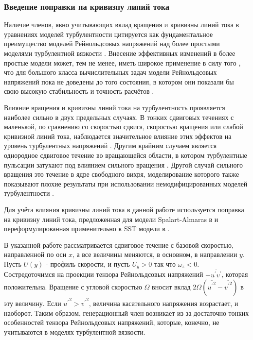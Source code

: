 \documentclass[pdftex,a4paper,12pt]{article}
\begin{document}
	\subsubsection{Введение поправки на кривизну линий тока}
		\label{CC}
		Наличие членов, явно учитывающих вклад вращения и кривизны линий тока в уравнениях моделей турбулентности цитируется как фундаментальное преимущество моделей Рейнольдсовых напряжений над более простыми моделями турбулентной вязкости \cite{ShurSpallart}. Внесение эффективных изменений в более простые модели может, тем не менее, иметь широкое применение в силу того \cite{CC2}, что для большого класса вычислительных задач модели Рейнольдсовых напряжений пока не доведены до того состояния, в котором они показали бы свою высокую стабильность и точность расчётов \cite{CC3}.
		
		Влияние вращения и кривизны линий тока на турбулентность проявляется наиболее сильно в двух предельных случаях. В тонких сдвиговых течениях с маленькой, по сравнению со скоростью сдвига, скоростью вращения или слабой кривизной линий тока, наблюдается значительное влияние этих эффектов на уровень турбулентных напряжений \cite{Bradshaw}. Другим крайним случаем является однородное сдвиговое течение во вращающейся области, в котором турбулентные пульсации затухают под влиянием сильного вращения \cite{Speziale}. Другой случай сильного вращения это течение в ядре свободного вихря, моделирование которого также показывают плохие результаты при использовании немодифицированных моделей турбулентности \cite{Govindaraju}.
		
		Для учёта влияния кривизны линий тока в данной работе используется поправка на кривизну линий тока, предложенная для модели Spalart-Almaras в \cite{ShurSpallart} и переформулированная применительно к SST модели в \cite{Smirnov}.
		
		В указанной работе рассматривается сдвиговое течение с базовой скоростью, направленной по оси $x$, а все величины меняются, в основном, в направлении $y$. Пусть $U(y)$ - профиль скорости, и пусть $U_y > 0$ так что $\omega_z < 0$. Состредоточимся на проекции тензора Рейнольдсовых напряжений $-\overline{u^{'}v^{'}}$, которая положительна. Вращение с угловой скоростью $\Omega$ вносит вклад $2\Omega(\overline{{u^{'}}^2}-\overline{{v^{'}}^2})$ в эту величину. Если $\overline{{u^{'}}^2} > \overline{{v^{'}}^2}$, величина касательного напряжения возрастает, и наоборот. Таким образом, генерационный член возникает из-за достаточно тонких особенностей тензора Рейнольдсовых напряжений, которые, конечно, не учитываются в моделях турбулентной вязкости.
		
\end{document}
